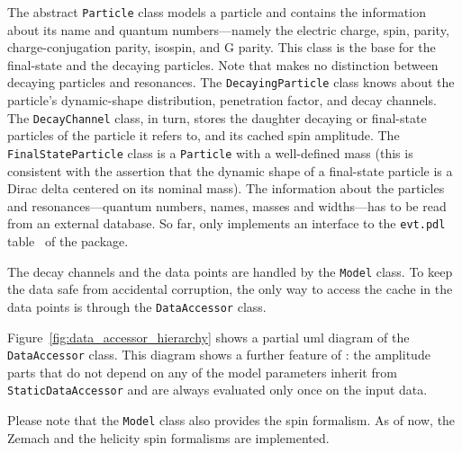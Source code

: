     The abstract \lstinline!Particle! class models a particle and contains the information about its name and quantum numbers---namely the electric charge, spin, parity, charge-conjugation parity, isospin, and G parity.
    This class is the base for the final-state and the decaying particles.
    Note that  makes no distinction between decaying particles and resonances.
    The \lstinline!DecayingParticle! class knows about the particle's dynamic-shape distribution, penetration factor, and decay channels.
    The \lstinline!DecayChannel! class, in turn, stores the daughter decaying or final-state particles of the particle it refers to, and its cached spin amplitude.
    The \lstinline!FinalStateParticle! class is a \lstinline!Particle! with a well-defined mass (this is consistent with the assertion that the dynamic shape of a final-state particle is a Dirac delta centered on its nominal mass).
    The information about the particles and resonances---quantum numbers, names, masses and widths---has to be read from an external database.
    So far,  only implements an interface to the \texttt{evt.pdl} table~\cite[p.~13]{evtgen_manual} of the  package.


    The decay channels and the data points are handled by the \lstinline!Model! class.
    To keep the data safe from accidental corruption, the only way to access the cache in the data points is through the \lstinline!DataAccessor! class.
    \begin{sidewaysfigure}
        \centering
        
        \caption{A simplified \ac{uml} diagram that shows some of the daughter classes of \lstinline!DataAccessor!.}
        \label{fig:data_accessor_hierarchy}
    \end{sidewaysfigure}
    Figure~\ref{fig:data_accessor_hierarchy} shows a partial \ac{uml} diagram of the \lstinline!DataAccessor! class.
    This diagram shows a further feature of : the amplitude parts that do not depend on any of the model parameters inherit from \lstinline!StaticDataAccessor! and are always evaluated only once on the input data.


    Please note that the \lstinline!Model! class also provides the spin formalism.
    As of now, the Zemach and the helicity spin formalisms are implemented.


